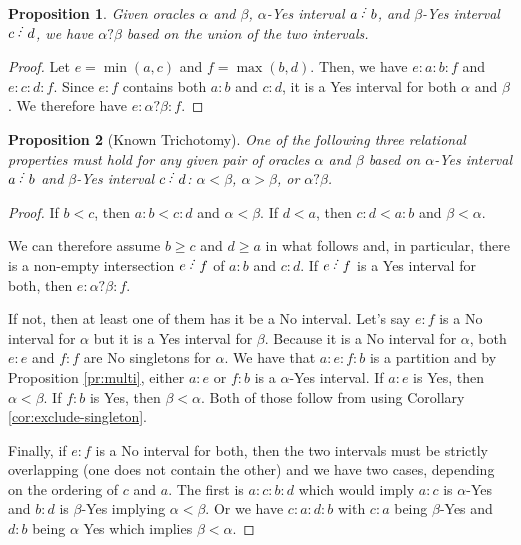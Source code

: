 \documentclass[12pt]{article}
\newtheorem{proposition}{Proposition}[subsection]
\begin{document}
\begin{proposition}
    Given oracles $\alpha$ and $\beta$,  $\alpha$-Yes interval $a\lte b$, and $\beta$-Yes interval $c\lte d$, we have $\alpha ? \beta$ based on the union of the two intervals.  
\end{proposition}

\begin{proof}
Let $e= \min(a,c)$ and $f = \max(b,d)$. Then, we have $e:a:b:f$ and $e:c:d:f$. Since $e:f$ contains both $a:b$ and $c:d$, it is a Yes interval for both $\alpha$ and $\beta$. We therefore have $e:\alpha?\beta:f$.
\end{proof}

\begin{proposition}[Known Trichotomy]
One of the following three relational properties must hold for any given pair of oracles $\alpha$ and $\beta$ based on $\alpha$-Yes interval $a \lte b$ and $\beta$-Yes interval $c \lte d$: $\alpha < \beta$,  $\alpha > \beta$, or $\alpha ? \beta$. 
\end{proposition}

\begin{proof}
     If $b < c$, then $a:b < c:d$ and $\alpha < \beta$. If $d < a$, then $c:d < a:b$ and $\beta < \alpha$. 
     
     We can therefore assume $b \geq c$ and $d \geq a$ in what follows and, in particular, there is a non-empty intersection $e\lte f$ of $a:b$ and $c:d$.  If $e \lte f$ is a Yes interval for both, then $e:\alpha ? \beta:f$. 
     
     If not, then at least one of them has it be a No interval. Let's say $e:f$ is a No interval for $\alpha$ but it is a Yes interval for $\beta$. Because it is a No interval for $\alpha$, both $e:e$ and $f:f$ are No singletons for $\alpha$. We have that $a:e:f:b$ is a partition and by Proposition \ref{pr:multi}, either $a:e$ or $f:b$ is a $\alpha$-Yes interval. If $a:e$ is Yes, then $\alpha < \beta$. If $f:b$ is Yes, then $\beta < \alpha$. Both of those follow from using Corollary \ref{cor:exclude-singleton}. 
     
     Finally, if $e:f$ is a No interval for both, then the two intervals must be strictly overlapping (one does not contain the other) and we have two cases, depending on the ordering of $c$ and $a$. The first is $a:c:b:d$ which would imply $a:c$ is $\alpha$-Yes and $b:d$ is $\beta$-Yes implying $\alpha < \beta$. Or we have $c:a:d:b$ with $c:a$ being $\beta$-Yes and $d:b$ being $\alpha$ Yes which implies $\beta < \alpha$. 
     
\end{proof}
\end{document}
